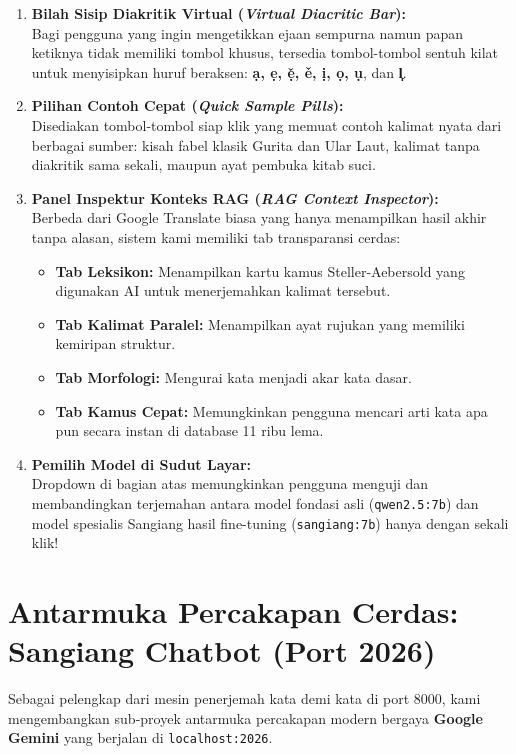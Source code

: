 \begin{enumerate}
    \item \textbf{Bilah Sisip Diakritik Virtual (\textit{Virtual Diacritic Bar}):} \\
    Bagi pengguna yang ingin mengetikkan ejaan sempurna namun papan ketiknya tidak memiliki tombol khusus, tersedia tombol-tombol sentuh kilat untuk menyisipkan huruf beraksen: \textbf{\d{a}, \d{e}, \v{\d{e}}, \v{e}, \d{i}, \d{o}, \d{u}}, dan \textbf{l᷊}.
    \item \textbf{Pilihan Contoh Cepat (\textit{Quick Sample Pills}):} \\
    Disediakan tombol-tombol siap klik yang memuat contoh kalimat nyata dari berbagai sumber: kisah fabel klasik Gurita dan Ular Laut, kalimat tanpa diakritik sama sekali, maupun ayat pembuka kitab suci.
    \item \textbf{Panel Inspektur Konteks RAG (\textit{RAG Context Inspector}):} \\
    Berbeda dari Google Translate biasa yang hanya menampilkan hasil akhir tanpa alasan, sistem kami memiliki tab transparansi cerdas:
    \begin{itemize}
        \item \textbf{Tab Leksikon:} Menampilkan kartu kamus Steller-Aebersold yang digunakan AI untuk menerjemahkan kalimat tersebut.
        \item \textbf{Tab Kalimat Paralel:} Menampilkan ayat rujukan yang memiliki kemiripan struktur.
        \item \textbf{Tab Morfologi:} Mengurai kata menjadi akar kata dasar.
        \item \textbf{Tab Kamus Cepat:} Memungkinkan pengguna mencari arti kata apa pun secara instan di database 11 ribu lema.
    \end{itemize}
    \item \textbf{Pemilih Model di Sudut Layar:} \\
    Dropdown di bagian atas memungkinkan pengguna menguji dan membandingkan terjemahan antara model fondasi asli (\texttt{qwen2.5:7b}) dan model spesialis Sangiang hasil fine-tuning (\texttt{sangiang:7b}) hanya dengan sekali klik!
\end{enumerate}

\section{Antarmuka Percakapan Cerdas: Sangiang Chatbot (Port 2026)}
Sebagai pelengkap dari mesin penerjemah kata demi kata di port 8000, kami mengembangkan sub-proyek antarmuka percakapan modern bergaya \textbf{Google Gemini} yang berjalan di \texttt{localhost:2026}.

